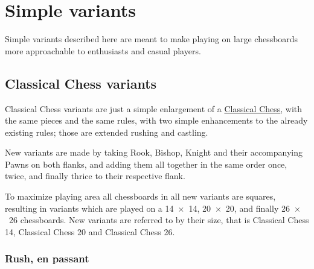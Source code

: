 

\chapter*{Simple variants}
\label{ch:Simple variants}

Simple variants described here are meant to make playing on large chessboards
more approachable to enthusiasts and casual players.


\section*{Classical Chess variants}
\label{sec:Simple variants/Classical Chess variants}

Classical Chess variants are just a simple enlargement of a
\href{https://en.wikipedia.org/wiki/Chess}{Classical Chess},
with the same pieces and the same rules, with two simple enhancements to the
already existing rules; those are extended rushing and castling.

New variants are made by taking Rook, Bishop, Knight and their accompanying
Pawns on both flanks, and adding them all together in the same order once,
twice, and finally thrice to their respective flank.

To maximize playing area all chessboards in all new variants are squares,
resulting in variants which are played on a 14~$\times$~14, 20~$\times$~20,
and finally 26~$\times$~26 chessboards.\newline
\indent
New variants are referred to by their size, that is Classical Chess 14,
Classical Chess 20 and Classical Chess 26.

\clearpage %

\subsection*{Rush, en passant}
\label{sec:Simple variants/Classical Chess variants/Rush, en passant}

